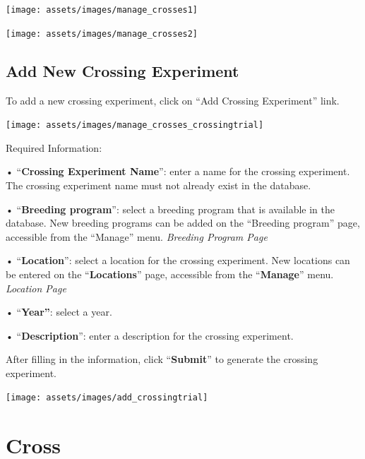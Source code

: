 \documentclass[
  12pt,
]{book}
\begin{document}
\begin{center}\texttt{[image: assets/images/manage\_crosses1]} \end{center}

\begin{center}\texttt{[image: assets/images/manage\_crosses2]} \end{center}

\hypertarget{add-new-crossing-experiment}{%
\subsection{Add New Crossing Experiment}\label{add-new-crossing-experiment}}

To add a new crossing experiment, click on ``Add Crossing Experiment'' link.

\begin{center}\texttt{[image: assets/images/manage\_crosses\_crossingtrial]} \end{center}

Required Information:

• ``\textbf{Crossing Experiment Name}'': enter a name for the crossing experiment. The crossing experiment name must not already exist in the database.

• ``\textbf{Breeding program}'': select a breeding program that is available in the database. New breeding programs can be added on the ``Breeding program'' page, accessible from the ``Manage'' menu. \emph{Breeding Program Page}

• ``\textbf{Location}'': select a location for the crossing experiment. New locations can be entered on the ``\textbf{Locations}'' page, accessible from the ``\textbf{Manage}'' menu. \emph{Location Page}

• ``\textbf{Year''}: select a year.

• ``\textbf{Description}'': enter a description for the crossing experiment.

After filling in the information, click ``\textbf{Submit}'' to generate the crossing experiment.

\begin{center}\texttt{[image: assets/images/add\_crossingtrial]} \end{center}

\hypertarget{cross}{%
\section{Cross}\label{cross}}
\end{document}
